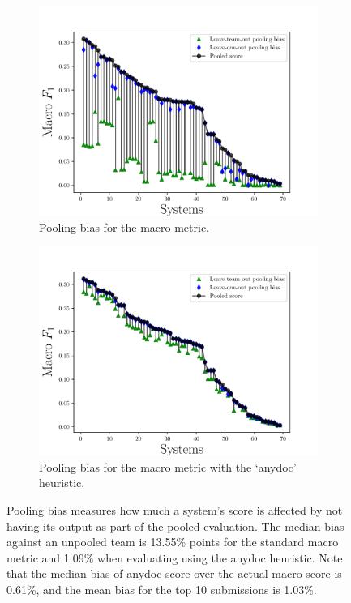 \begin{figure}
  \begin{subfigure}{\columnwidth}
  \includegraphics[width=\columnwidth]{figures/pooling-bias}
  \caption{\label{fig:pooling-bias} Pooling bias for the macro \fone{} metric.}
  \end{subfigure}
  \begin{subfigure}{\columnwidth}
  \includegraphics[width=\columnwidth]{figures/pooling-bias-anydoc}
  \caption{\label{fig:pooling-bias-anydoc} Pooling bias for the macro \fone{} metric with the `anydoc' heuristic.}
  \end{subfigure}
  \caption{Pooling bias measures how much a system's score is affected by not having its output as part of the pooled evaluation.
  The median bias against an unpooled team is 13.55\% points for the standard macro \fone{} metric and 1.09\% when evaluating using the anydoc heuristic.
  Note that the median bias of anydoc score over the actual macro score is 0.61\%, and the mean bias for the top 10 submissions is 1.03\%.
  }
\end{figure}

